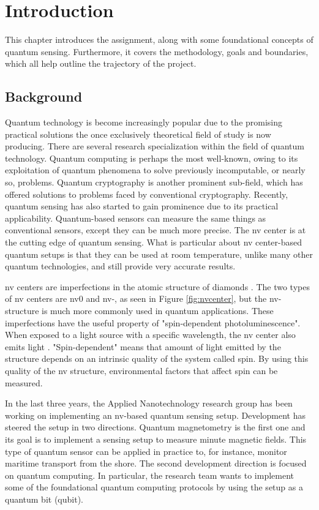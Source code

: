 \chapter{Introduction}\label{chap:intro}
This chapter introduces the assignment, along with some foundational concepts of quantum sensing. Furthermore, it covers the methodology, goals and boundaries, which all help outline the trajectory of the project.

\section{Background}\label{chap:background}
Quantum technology is become increasingly popular due to the promising practical solutions the once exclusively theoretical field of study is now producing. There are several research specialization within the field of quantum technology. Quantum computing is perhaps the most well-known, owing to its exploitation of quantum phenomena to solve previously incomputable, or nearly so, problems. Quantum cryptography is another prominent sub-field, which has offered solutions to problems faced by conventional cryptography. Recently, quantum sensing has also started to gain prominence due to its practical applicability. Quantum-based sensors can measure the same things as conventional sensors, except they can be much more precise. The \gls{nv} center is at the cutting edge of quantum sensing. What is particular about \gls{nv} center-based quantum setups is that they can be used at room temperature, unlike many other quantum technologies, and still provide very accurate results.


\gls{nv} centers are imperfections in the atomic structure of diamonds \cite{enwiki:1301369588}. The two types of \gls{nv} centers are \gls{nv}0 and \gls{nv}-, as seen in Figure \ref{fig:nvcenter}, but the \gls{nv}- structure is much more commonly used in quantum applications. These imperfections have the useful property of "spin-dependent photoluminescence". When exposed to a light source with a specific wavelength, the \gls{nv} center also emits light \cite{enwiki:1309081879}. "Spin-dependent" means that amount of light emitted by the structure depends on an intrinsic quality of the system called spin. By using this quality of the \gls{nv} structure, environmental factors that affect spin can be measured. 

In the last three years, the Applied Nanotechnology research group has been working on implementing an \gls{nv}-based quantum sensing setup. Development has steered the setup in two directions. Quantum magnetometry is the first one and its goal is to implement a sensing setup to measure minute magnetic fields. This type of quantum sensor can be applied in practice to, for instance, monitor maritime transport from the shore. The second development direction is focused on quantum computing. In particular, the research team wants to implement some of the foundational quantum computing protocols by using the setup as a quantum bit (qubit).

